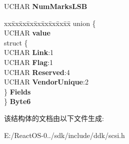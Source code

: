 \begin{DoxyCompactItemize}
U\+C\+H\+AR {\bfseries Num\+Marks\+L\+SB}
\item 
\mbox{\label{struct___c_d_b_1_1___s_p_a_c_e___t_a_p_e___m_a_r_k_s_a7781368c53df72f44c10c7b74e5bd3b8}} 
\begin{tabbing}
xx\=xx\=xx\=xx\=xx\=xx\=xx\=xx\=xx\=\kill
union \{\\
\>UCHAR {\bfseries value}\\
\>struct \{\\
\>\>UCHAR {\bfseries Link}:1\\
\>\>UCHAR {\bfseries Flag}:1\\
\>\>UCHAR {\bfseries Reserved}:4\\
\>\>UCHAR {\bfseries VendorUnique}:2\\
\>\} {\bfseries Fields}\\
\} {\bfseries Byte6}\\

\end{tabbing}\end{DoxyCompactItemize}


该结构体的文档由以下文件生成\+:\begin{DoxyCompactItemize}
\item 
E\+:/\+React\+O\+S-\/0../sdk/include/ddk/scsi.\+h\end{DoxyCompactItemize}
